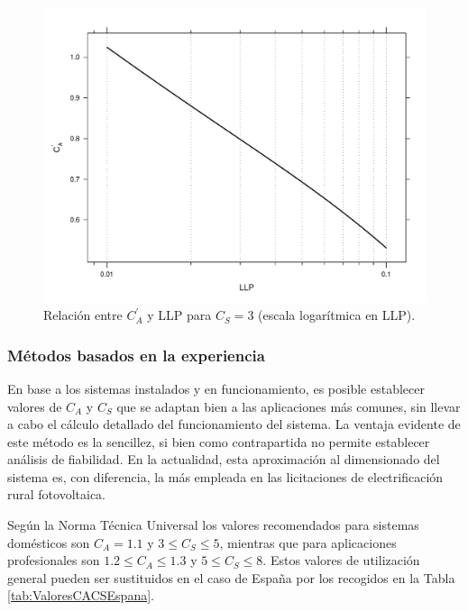 %
\begin{figure}
\includegraphics[scale=0.75]{../figs/CurvasLLP_Cs3}

\caption[Relación entre $C_{A}^{'}$ y LLP]{Relación entre $C_{A}^{'}$ y LLP para $C_{S}=3$ (escala logarítmica
en LLP).\label{fig:Ca_LLP_Cs3}}

\end{figure}



\subsubsection{Métodos basados en la experiencia}

En base a los sistemas instalados y en funcionamiento, es posible
establecer valores de $C_{A}$ y $C_{S}$ que se adaptan bien a las
aplicaciones más comunes, sin llevar a cabo el cálculo detallado del
funcionamiento del sistema. La ventaja evidente de este método es
la sencillez, si bien como contrapartida no permite establecer análisis
de fiabilidad. En la actualidad, esta aproximación al dimensionado
del sistema es, con diferencia, la más empleada en las licitaciones
de electrificación rural fotovoltaica.

Según la Norma Técnica Universal \citep{Egido.Lorenzo1998} los valores
recomendados para sistemas domésticos son $C_{A}=1.1$ y $3\leq C_{S}\leq5$,
mientras que para aplicaciones profesionales son $1.2\leq C_{A}\leq1.3$
y $5\leq C_{S}\leq8$. Estos valores de utilización general pueden
ser sustituidos en el caso de España por los recogidos en la Tabla
\ref{tab:ValoresCACSEspana}.

